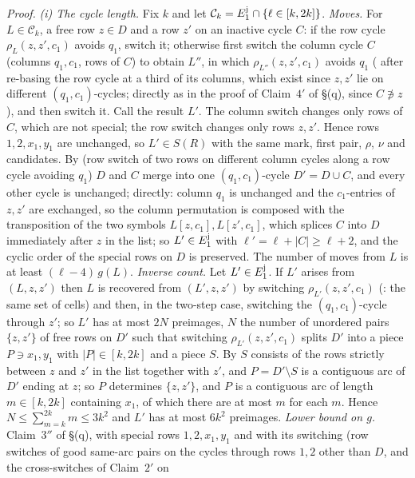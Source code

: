 \emph{Proof.}  \emph{(i) The cycle length.}  Fix $k$ and let
$\mathcal C_k=E_1^{\rm j}\cap\{\ell\in[k,2k]\}$.  \emph{Moves.}  For
$L\in\mathcal C_k$, a free row $z\in D$ and a row $z'$ on an inactive
cycle $C$: if the row cycle $\rho_L(z,z',c_1)$ avoids $q_1$, switch
it; otherwise first switch the column cycle $C$ (columns $q_1,c_1$,
rows of $C$) to obtain $L''$, in which $\rho_{L''}(z,z',c_1)$ avoids
$q_1$ (\cite[Lemma~2.3(1)]{AM26} after re-basing the row cycle at a
third of its columns, which exist since $z,z'$ lie on different
$(q_1,c_1)$-cycles; directly as in the proof of Claim~$4'$ of \S(q),
since $C\not\ni z$), and then switch it.  Call the
result $L'$.  The column switch changes only rows of $C$, which are
not special; the row switch changes only rows $z,z'$.  Hence rows
$1,2,x_1,y_1$ are unchanged, so $L'\in S(R)$ with the same mark, first
pair, $\rho$, $\nu$ and candidates.  By \cite[Lemma~2.4(2)]{AM26}
(row switch of two rows on different column cycles along a row cycle
avoiding $q_1$) $D$ and $C$ merge into one $(q_1,c_1)$-cycle
$D'=D\cup C$, and every other cycle is unchanged; directly: column
$q_1$ is unchanged and the $c_1$-entries of $z,z'$ are exchanged, so
the column permutation is composed with the transposition of the two
symbols $L[z,c_1],L[z',c_1]$, which splices $C$ into $D$ immediately
after $z$ in the list; so $L'\in E_1^{\rm j}$ with
$\ell'=\ell+|C|\ge\ell+2$, and the cyclic order of the special rows on
$D$ is preserved.  The number of moves from $L$ is at least
$(\ell-4)\,g(L)$.  \emph{Inverse count.}  Let $L'\in E_1^{\rm j}$.  If
$L'$ arises from $(L,z,z')$ then $L$ is recovered from $(L',z,z')$ by
switching $\rho_{L'}(z,z',c_1)$ (\cite[Fact~2.1]{AM26}: the same set
of cells) and then, in the two-step case, switching the
$(q_1,c_1)$-cycle through $z'$; so $L'$ has at most $2N$ preimages,
$N$ the number of unordered pairs $\{z,z'\}$ of free rows on $D'$ such
that switching $\rho_{L'}(z,z',c_1)$ splits $D'$ into a piece $P\ni
x_1,y_1$ with $|P|\in[k,2k]$ and a piece $S$.  By
\cite[Lemma~2.4(1)]{AM26} $S$ consists of the rows strictly between
$z$ and $z'$ in the list together with $z'$, and $P=D'\setminus S$ is
a contiguous arc of $D'$ ending at $z$; so $P$ determines $\{z,z'\}$,
and $P$ is a contiguous arc of length $m\in[k,2k]$ containing $x_1$,
of which there are at most $m$ for each $m$.  Hence $N\le\sum_{m=k}^{2k}m\le3k^2$
and $L'$ has at most $6k^2$ preimages.  \emph{Lower bound on $g$.}
Claim~$3''$ of \S(q), with special rows $1,2,x_1,y_1$ and with its
switching (row switches of good same-arc pairs on the cycles through
rows $1,2$ other than $D$, and the cross-switches of Claim~$2'$ on

